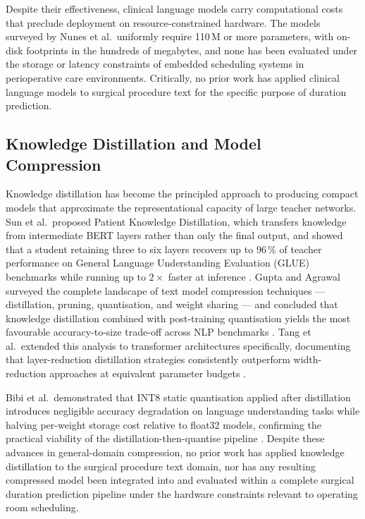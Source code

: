 \documentclass[3p]{elsarticle}
\begin{document}
Despite their effectiveness, clinical language models carry computational costs that preclude deployment on resource-constrained hardware. The models surveyed by Nunes et al.\ uniformly require 110\,M or more parameters, with on-disk footprints in the hundreds of megabytes, and none has been evaluated under the storage or latency constraints of embedded scheduling systems in perioperative care environments. Critically, no prior work has applied clinical language models to surgical procedure text for the specific purpose of duration prediction.

\subsection{Knowledge Distillation and Model Compression}
\label{sec:rw_kd}

Knowledge distillation has become the principled approach to producing compact models that approximate the representational capacity of large teacher networks. Sun et al.\ proposed Patient Knowledge Distillation, which transfers knowledge from intermediate BERT layers rather than only the final output, and showed that a student retaining three to six layers recovers up to 96\,\% of teacher performance on General Language Understanding Evaluation (GLUE) benchmarks while running up to $2\times$ faster at inference \cite{sun2019patient}. Gupta and Agrawal surveyed the complete landscape of text model compression techniques — distillation, pruning, quantisation, and weight sharing — and concluded that knowledge distillation combined with post-training quantisation yields the most favourable accuracy-to-size trade-off across NLP benchmarks \cite{gupta2022compression}. Tang et al.\ extended this analysis to transformer architectures specifically, documenting that layer-reduction distillation strategies consistently outperform width-reduction approaches at equivalent parameter budgets \cite{tang2024survey}.

Bibi et al.\ demonstrated that INT8 static quantisation applied after distillation introduces negligible accuracy degradation on language understanding tasks while halving per-weight storage cost relative to float32 models, confirming the practical viability of the distillation-then-quantise pipeline \cite{bibi2024advances}. Despite these advances in general-domain compression, no prior work has applied knowledge distillation to the surgical procedure text domain, nor has any resulting compressed model been integrated into and evaluated within a complete surgical duration prediction pipeline under the hardware constraints relevant to operating room scheduling.
\end{document}
